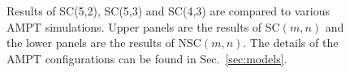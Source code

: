 \documentclass[ALICE,manyauthors]{cernphprep}
\begin{document}
\begin{figure}[p]
\begin{center}
        \caption{Results of  SC(5,2), SC(5,3) and SC(4,3) are compared to various AMPT simulations. Upper panels are the results of SC$(m,n)$ and the lower panels are the results of NSC$(m,n)$. The details of the AMPT configurations can be found in Sec.~\ref{sec:models}.}
        \label{fig:Figure_7}
        \end{center}   
 \end{figure}
 
 \newpage
\end{document}
